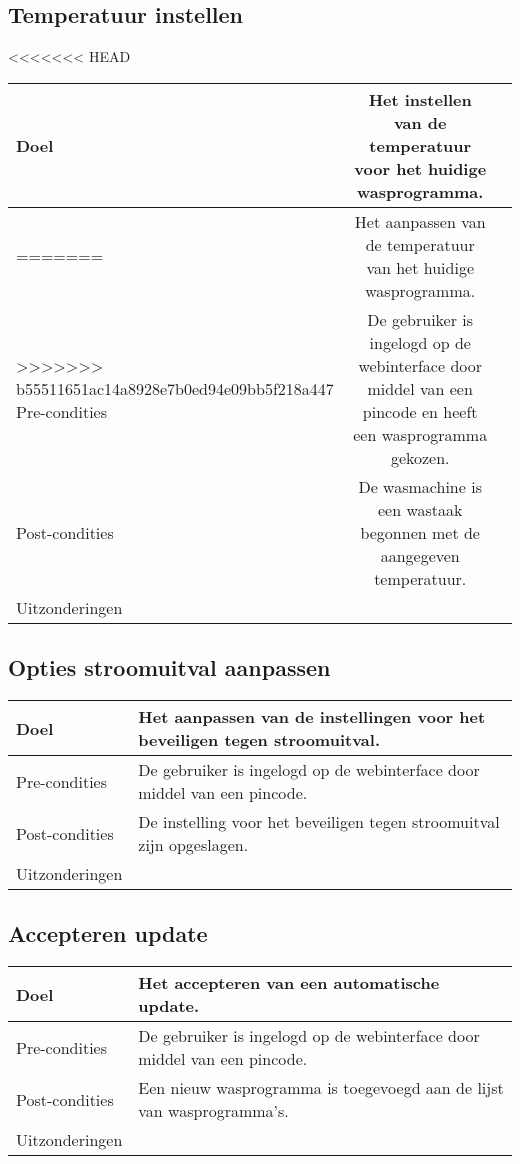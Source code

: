\subsection{Temperatuur instellen}
\begin{center}
<<<<<<< HEAD
  \begin{tabular}{ l | c | r | }
    \hline
    Doel & Het instellen van de temperatuur voor het huidige wasprogramma. \\ \hline
=======
  \begin{tabular}{ | p{4cm} | p{8.5cm} | }    \hline
    Doel & Het aanpassen van de temperatuur van het huidige wasprogramma. \\ \hline
>>>>>>> b55511651ac14a8928e7b0ed94e09bb5f218a447
    Pre-condities & De gebruiker is ingelogd op de webinterface door middel van een pincode en heeft een wasprogramma gekozen. \\ \hline
    Post-condities & De wasmachine is een wastaak begonnen met de aangegeven temperatuur. \\ \hline
    Uitzonderingen &  \\
    \hline
  \end{tabular}
\end{center}

\subsection{Opties stroomuitval aanpassen}
\begin{center}
  \begin{tabular}{ | p{4cm} | p{8.5cm} | }    \hline
    Doel & Het aanpassen van de instellingen voor het beveiligen tegen stroomuitval. \\ \hline
    Pre-condities & De gebruiker is ingelogd op de webinterface door middel van een pincode. \\ \hline
    Post-condities & De instelling voor het beveiligen tegen stroomuitval zijn opgeslagen. \\ \hline
    Uitzonderingen &  \\
    \hline
  \end{tabular}
\end{center}

\subsection{Accepteren update}
\begin{center}
  \begin{tabular}{ | p{4cm} | p{8.5cm} | }    \hline
    Doel & Het accepteren van een automatische update. \\ \hline
    Pre-condities & De gebruiker is ingelogd op de webinterface door middel van een pincode. \\ \hline
    Post-condities & Een nieuw wasprogramma is toegevoegd aan de lijst van wasprogramma's. \\ \hline
    Uitzonderingen &  \\
    \hline
  \end{tabular}
\end{center}

